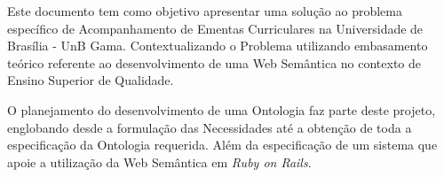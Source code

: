 
Este documento tem como objetivo apresentar uma solução ao problema específico de Acompanhamento de Ementas Curriculares na Universidade de Brasília - UnB Gama. Contextualizando o Problema utilizando embasamento teórico referente ao desenvolvimento de uma Web Semântica no contexto de Ensino Superior de Qualidade.

O planejamento do desenvolvimento de uma Ontologia faz parte deste projeto, englobando desde a formulação das Necessidades até a obtenção de toda a especificação da Ontologia requerida. Além da especificação de um sistema que apoie a utilização da Web Semântica em \textit{Ruby on Rails}.